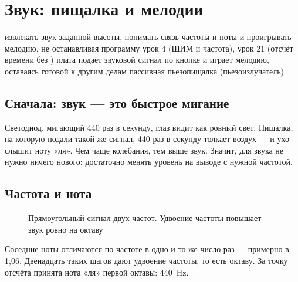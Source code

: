 \section{Звук: пищалка и мелодии}
\lessonintro
  {извлекать звук заданной высоты, понимать связь частоты и ноты и проигрывать мелодию, не останавливая программу}
  {урок 4 (ШИМ и частота), урок 21 (отсчёт времени без )}
  {плата подаёт звуковой сигнал по кнопке и играет мелодию, оставаясь готовой к другим делам}
  {пассивная пьезопищалка (пьезоизлучатель)}

\subsection{Сначала: звук --- это быстрое мигание}

Светодиод, мигающий 440 раз в секунду, глаз видит как ровный свет. Пищалка, на которую подали такой же
сигнал, 440 раз в секунду толкает воздух --- и ухо слышит ноту «ля». Чем чаще колебания, тем выше звук.
Значит, для звука не нужно ничего нового: достаточно менять уровень на выводе с нужной частотой.

\subsection{Частота и нота}

\begin{figure}[H]
\centering
{}
\caption{Прямоугольный сигнал двух частот. Удвоение частоты повышает звук ровно на октаву}
\end{figure}

Соседние ноты отличаются по частоте в одно и то же число раз --- примерно в 1,06. Двенадцать таких шагов
дают удвоение частоты, то есть октаву. За точку отсчёта принята нота «ля» первой октавы: \SI{440}{Hz}.

